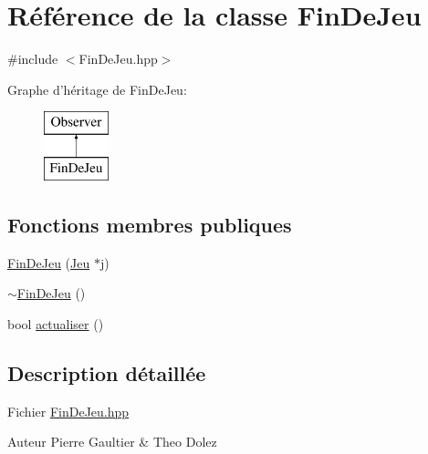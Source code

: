 \hypertarget{class_fin_de_jeu}{\section{\-Référence de la classe \-Fin\-De\-Jeu}
\label{class_fin_de_jeu}
}


{\ttfamily \#include $<$\-Fin\-De\-Jeu.\-hpp$>$}

\-Graphe d'héritage de \-Fin\-De\-Jeu\-:\begin{figure}[H]
\begin{center}
\leavevmode
\includegraphics[height=2.000000cm]{class_fin_de_jeu}
\end{center}
\end{figure}
\subsection*{\-Fonctions membres publiques}
\begin{DoxyCompactItemize}
\item 
\hyperlink{class_fin_de_jeu_af86c4d468aec3ffb9ed59c02016aadcf}{\-Fin\-De\-Jeu} (\hyperlink{class_jeu}{\-Jeu} $\ast$j)
\item 
\hyperlink{class_fin_de_jeu_a7f80425c93ed96eadb13ac5e7bb51bd4}{$\sim$\-Fin\-De\-Jeu} ()
\item 
bool \hyperlink{class_fin_de_jeu_a79c3fb0a9e367cd3e62da14af840f871}{actualiser} ()
\end{DoxyCompactItemize}


\subsection{\-Description détaillée}
\-Fichier \hyperlink{_fin_de_jeu_8hpp}{\-Fin\-De\-Jeu.\-hpp} \begin{DoxyAuthor}{\-Auteur}
\-Pierre \-Gaultier \& \-Theo \-Dolez 
\end{DoxyAuthor}


